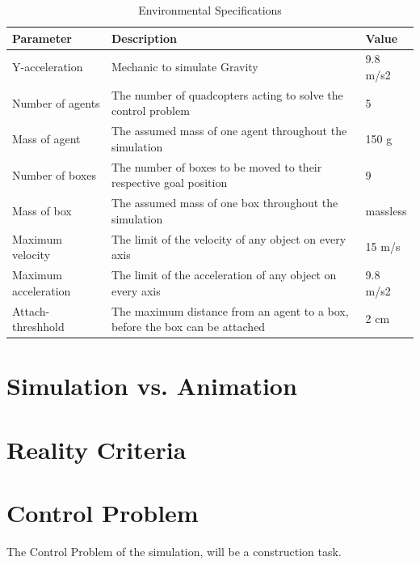 \begin{table}[]
\centering
\label{sim:env_specs}
\begin{tabular}{@{}lll@{}}
\toprule
\textbf{Parameter}   & \textbf{Description}                                                        & \textbf{Value} \\ \midrule
Y-acceleration       & Mechanic to simulate Gravity                                                & 9.8 m/s2       \\
Number of agents     & The number of quadcopters acting to solve the control problem               & 5              \\
Mass of agent        & The assumed mass of one agent throughout the simulation                     & 150 g          \\
Number of boxes      & The number of boxes to be moved to their respective goal position           & 9              \\
Mass of box          & The assumed mass of one box throughout the simulation                       & massless       \\
Maximum velocity     & The limit of the velocity of any object on every axis                       & 15 m/s         \\
Maximum acceleration & The limit of the acceleration of any object on every axis                   & 9.8 m/s2       \\
Attach-threshhold     & The maximum distance from an agent to a box, before the box can be attached & 2 cm           \\ \bottomrule
\end{tabular}
\caption{Environmental Specifications}
\end{table}
\section{Simulation vs. Animation}
\label{sec:simulation_animation}


\section{Reality Criteria}
\label{sec:reality}

\section{Control Problem}
\label{sec:control_problem}
The Control Problem of the simulation, will be a construction task. 

